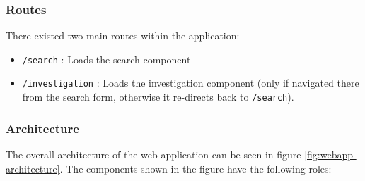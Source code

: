 \subsubsection{Routes}
There existed two main routes within the application:
\begin{itemize}
    \item \texttt{/search} : Loads the search component
    \item\texttt{/investigation} : Loads the investigation component (only if navigated there from the search form, otherwise it re-directs back to \texttt{/search}).
\end{itemize}

\subsubsection{Architecture}
The overall architecture of the web application can be seen in figure \ref{fig:webapp-architecture}. The components shown in the figure have the following roles:
